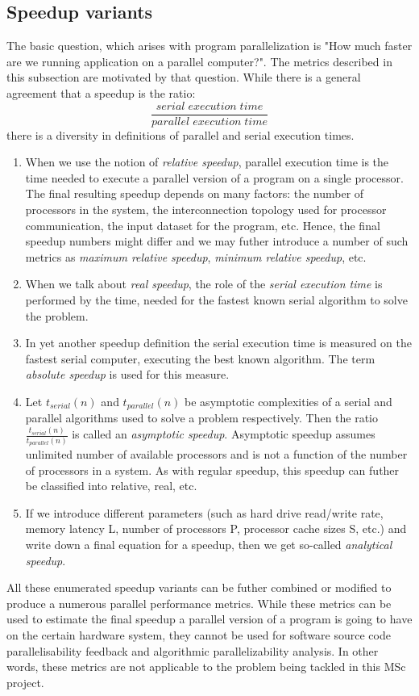 \subsection{Speedup variants}
\label{background-metrics-speedup-variants}
\qquad The basic question, which arises with program parallelization is "How much faster are we running application on a parallel computer?". The metrics described in this subsection are motivated by that question. While there is a general agreement that a speedup is the ratio:
\begin{equation}
\frac{serial\; execution\; time}{parallel\; execution\; time}
\label{basic-speedup}
\end{equation}
there is a diversity in definitions of parallel and serial execution times.
\begin{enumerate}[align=left,leftmargin=*]
\item \qquad When we use the notion of \textit{relative speedup}, parallel execution time is the time needed to execute a parallel version of a program on a single processor. The final resulting speedup depends on many factors: the number of processors in the system, the interconnection topology used for processor communication, the input dataset for the program, etc. Hence, the final speedup numbers might differ and we may futher introduce a number of such metrics as \textit{maximum relative speedup}, \textit{minimum relative speedup}, etc. 
\item \qquad When we talk about \textit{real speedup}, the role of the \textit{serial execution time} is performed by the time, needed for the fastest known serial algorithm to solve the problem.   
\item \qquad In yet another speedup definition the serial execution time is measured on the fastest serial computer, executing the best known algorithm. The term \textit{absolute speedup} is used for this measure. 
\item \qquad Let $t_{serial}(n)$ and $t_{parallel}(n)$ be asymptotic complexities of a serial and parallel algorithms used to solve a problem respectively. Then the ratio $\frac{t_{serial}(n)}{t_{parallel}(n)}$ is called an \textit{asymptotic speedup}. Asymptotic speedup assumes unlimited number of available processors and is not a function of the number of processors in a system. As with regular speedup, this speedup can futher be classified into relative, real, etc.
\item \qquad If we introduce different parameters (such as hard drive read/write rate, memory latency L, number of processors P, processor cache sizes S, etc.) and write down a final equation for a speedup, then we get so-called \textit{analytical speedup}. 

\end{enumerate} 
\qquad All these enumerated speedup variants can be futher combined or modified to produce a numerous parallel performance metrics. While these metrics can be used to estimate the final speedup a parallel version of a program is going to have on the certain hardware system, they cannot be used for software source code parallelisability feedback and algorithmic parallelizability analysis. In other words, these metrics are not applicable to the problem being tackled in this MSc project.  
   
